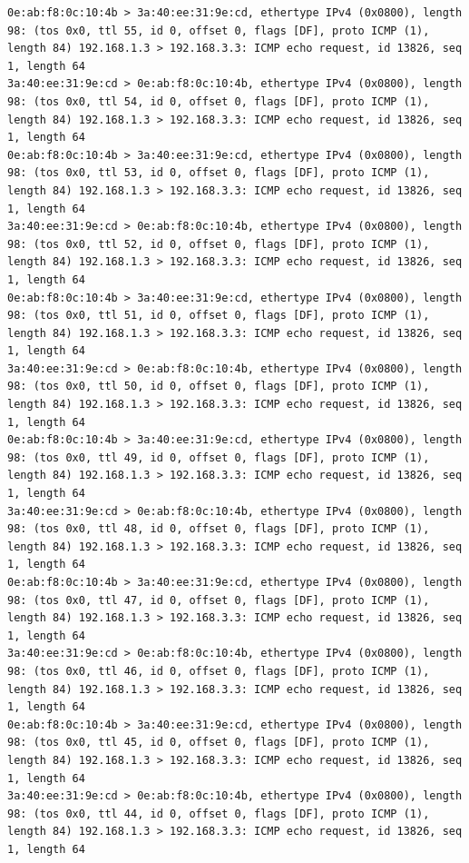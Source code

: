 \documentclass[a4paper,12pt]{article}
\begin{document}
\begin{Verbatim}
0e:ab:f8:0c:10:4b > 3a:40:ee:31:9e:cd, ethertype IPv4 (0x0800), length 98: (tos 0x0, ttl 55, id 0, offset 0, flags [DF], proto ICMP (1), length 84) 192.168.1.3 > 192.168.3.3: ICMP echo request, id 13826, seq 1, length 64
3a:40:ee:31:9e:cd > 0e:ab:f8:0c:10:4b, ethertype IPv4 (0x0800), length 98: (tos 0x0, ttl 54, id 0, offset 0, flags [DF], proto ICMP (1), length 84) 192.168.1.3 > 192.168.3.3: ICMP echo request, id 13826, seq 1, length 64
0e:ab:f8:0c:10:4b > 3a:40:ee:31:9e:cd, ethertype IPv4 (0x0800), length 98: (tos 0x0, ttl 53, id 0, offset 0, flags [DF], proto ICMP (1), length 84) 192.168.1.3 > 192.168.3.3: ICMP echo request, id 13826, seq 1, length 64
3a:40:ee:31:9e:cd > 0e:ab:f8:0c:10:4b, ethertype IPv4 (0x0800), length 98: (tos 0x0, ttl 52, id 0, offset 0, flags [DF], proto ICMP (1), length 84) 192.168.1.3 > 192.168.3.3: ICMP echo request, id 13826, seq 1, length 64
0e:ab:f8:0c:10:4b > 3a:40:ee:31:9e:cd, ethertype IPv4 (0x0800), length 98: (tos 0x0, ttl 51, id 0, offset 0, flags [DF], proto ICMP (1), length 84) 192.168.1.3 > 192.168.3.3: ICMP echo request, id 13826, seq 1, length 64
3a:40:ee:31:9e:cd > 0e:ab:f8:0c:10:4b, ethertype IPv4 (0x0800), length 98: (tos 0x0, ttl 50, id 0, offset 0, flags [DF], proto ICMP (1), length 84) 192.168.1.3 > 192.168.3.3: ICMP echo request, id 13826, seq 1, length 64
0e:ab:f8:0c:10:4b > 3a:40:ee:31:9e:cd, ethertype IPv4 (0x0800), length 98: (tos 0x0, ttl 49, id 0, offset 0, flags [DF], proto ICMP (1), length 84) 192.168.1.3 > 192.168.3.3: ICMP echo request, id 13826, seq 1, length 64
3a:40:ee:31:9e:cd > 0e:ab:f8:0c:10:4b, ethertype IPv4 (0x0800), length 98: (tos 0x0, ttl 48, id 0, offset 0, flags [DF], proto ICMP (1), length 84) 192.168.1.3 > 192.168.3.3: ICMP echo request, id 13826, seq 1, length 64
0e:ab:f8:0c:10:4b > 3a:40:ee:31:9e:cd, ethertype IPv4 (0x0800), length 98: (tos 0x0, ttl 47, id 0, offset 0, flags [DF], proto ICMP (1), length 84) 192.168.1.3 > 192.168.3.3: ICMP echo request, id 13826, seq 1, length 64
3a:40:ee:31:9e:cd > 0e:ab:f8:0c:10:4b, ethertype IPv4 (0x0800), length 98: (tos 0x0, ttl 46, id 0, offset 0, flags [DF], proto ICMP (1), length 84) 192.168.1.3 > 192.168.3.3: ICMP echo request, id 13826, seq 1, length 64
0e:ab:f8:0c:10:4b > 3a:40:ee:31:9e:cd, ethertype IPv4 (0x0800), length 98: (tos 0x0, ttl 45, id 0, offset 0, flags [DF], proto ICMP (1), length 84) 192.168.1.3 > 192.168.3.3: ICMP echo request, id 13826, seq 1, length 64
3a:40:ee:31:9e:cd > 0e:ab:f8:0c:10:4b, ethertype IPv4 (0x0800), length 98: (tos 0x0, ttl 44, id 0, offset 0, flags [DF], proto ICMP (1), length 84) 192.168.1.3 > 192.168.3.3: ICMP echo request, id 13826, seq 1, length 64

\end{Verbatim}
\end{document}
